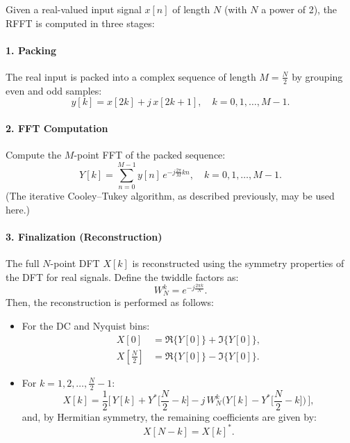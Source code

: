\documentclass[12pt,letter]{article}
\begin{document}
Given a real-valued input signal $x[n]$ of length $N$ (with $N$ a power of 2), the RFFT is computed in three stages:

\paragraph{1. Packing}
The real input is packed into a complex sequence of length $M = \frac{N}{2}$ by grouping even and odd samples:
\begin{equation}
y[k] = x[2k] + j\,x[2k+1], \quad k = 0, 1, \dots, M-1.
\label{eq:packing}
\end{equation}

\paragraph{2. FFT Computation}
Compute the $M$-point FFT of the packed sequence:
\begin{equation}
Y[k] = \sum_{n=0}^{M-1} y[n] \, e^{-j \frac{2\pi}{M} k n}, \quad k = 0, 1, \dots, M-1.
\label{eq:fft-computation}
\end{equation}
(The iterative Cooley–Tukey algorithm, as described previously, may be used here.)

\paragraph{3. Finalization (Reconstruction)}
The full $N$-point DFT $X[k]$ is reconstructed using the symmetry properties of the DFT for real signals. Define the twiddle factors as:
\[
W_N^k = e^{-j\frac{2\pi k}{N}}.
\]
Then, the reconstruction is performed as follows:
\begin{itemize}
  \item For the DC and Nyquist bins:
  \begin{align}
    X[0] &= \Re\{Y[0]\} + \Im\{Y[0]\}, \label{eq:dc}\\[1mm]
    X\left[\frac{N}{2}\right] &= \Re\{Y[0]\} - \Im\{Y[0]\}. \label{eq:nyquist}
  \end{align}
  \item For $k = 1, 2, \dots, \frac{N}{2}-1$:
  \begin{equation}
    X[k] = \frac{1}{2}\Big[\, Y[k] + Y^*\Big[\frac{N}{2}-k\Big] - j\,W_N^k\Big( Y[k] - Y^*\Big[\frac{N}{2}-k\Big] \Big)\,\Big],
    \label{eq:finalization}
  \end{equation}
  and, by Hermitian symmetry, the remaining coefficients are given by:
  \[
  X[N-k] = X[k]^*.
  \]
\end{itemize}
\end{document}

